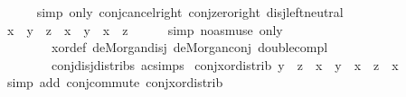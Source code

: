 \begin{isabellebody}
\ \ \ \ \isamarkupfalse%
\ {\isacharparenleft}{\kern0pt}simp\ only{\isacharcolon}{\kern0pt}\ conj{\isacharunderscore}{\kern0pt}cancel{\isacharunderscore}{\kern0pt}right\ conj{\isacharunderscore}{\kern0pt}zero{\isacharunderscore}{\kern0pt}right\ disj{\isachardot}{\kern0pt}left{\isacharunderscore}{\kern0pt}neutral{\isacharparenright}{\kern0pt}\isanewline
\ \ \isamarkupfalse%
\ \isamarkupfalse%
\ {\isachardoublequoteopen}x\ \isactrlbold {\isasymsqinter}\ {\isacharparenleft}{\kern0pt}y\ \isactrlbold {\isasymominus}\ z{\isacharparenright}{\kern0pt}\ {\isacharequal}{\kern0pt}\ {\isacharparenleft}{\kern0pt}x\ \isactrlbold {\isasymsqinter}\ y{\isacharparenright}{\kern0pt}\ \isactrlbold {\isasymominus}\ {\isacharparenleft}{\kern0pt}x\ \isactrlbold {\isasymsqinter}\ z{\isacharparenright}{\kern0pt}{\isachardoublequoteclose}\isanewline
\ \ \ \ \isamarkupfalse%
\ {\isacharparenleft}{\kern0pt}simp\ {\isacharparenleft}{\kern0pt}no{\isacharunderscore}{\kern0pt}asm{\isacharunderscore}{\kern0pt}use{\isacharparenright}{\kern0pt}\ only{\isacharcolon}{\kern0pt}\isanewline
\ \ \ \ \ \ \ \ xor{\isacharunderscore}{\kern0pt}def\ de{\isacharunderscore}{\kern0pt}Morgan{\isacharunderscore}{\kern0pt}disj\ de{\isacharunderscore}{\kern0pt}Morgan{\isacharunderscore}{\kern0pt}conj\ double{\isacharunderscore}{\kern0pt}compl\isanewline
\ \ \ \ \ \ \ \ conj{\isacharunderscore}{\kern0pt}disj{\isacharunderscore}{\kern0pt}distribs\ ac{\isacharunderscore}{\kern0pt}simps{\isacharparenright}{\kern0pt}\isanewline
{}\isamarkupfalse%
%
\endisatagproof
{\isafoldproof}%
%
\isadelimproof
\isanewline
%
\endisadelimproof
\isanewline
{}\isamarkupfalse%
\ conj{\isacharunderscore}{\kern0pt}xor{\isacharunderscore}{\kern0pt}distrib{}{\isacharcolon}{\kern0pt}\ {\isachardoublequoteopen}{\isacharparenleft}{\kern0pt}y\ \isactrlbold {\isasymominus}\ z{\isacharparenright}{\kern0pt}\ \isactrlbold {\isasymsqinter}\ x\ {\isacharequal}{\kern0pt}\ {\isacharparenleft}{\kern0pt}y\ \isactrlbold {\isasymsqinter}\ x{\isacharparenright}{\kern0pt}\ \isactrlbold {\isasymominus}\ {\isacharparenleft}{\kern0pt}z\ \isactrlbold {\isasymsqinter}\ x{\isacharparenright}{\kern0pt}{\isachardoublequoteclose}\isanewline
%
\isadelimproof
\ \ %
\endisadelimproof
%
\isatagproof
{}\isamarkupfalse%
\ {\isacharparenleft}{\kern0pt}simp\ add{\isacharcolon}{\kern0pt}\ conj{\isachardot}{\kern0pt}commute\ conj{\isacharunderscore}{\kern0pt}xor{\isacharunderscore}{\kern0pt}distrib{\isacharparenright}{\kern0pt}%
\endisatagproof
{\isafoldproof}%

\end{isabellebody}
